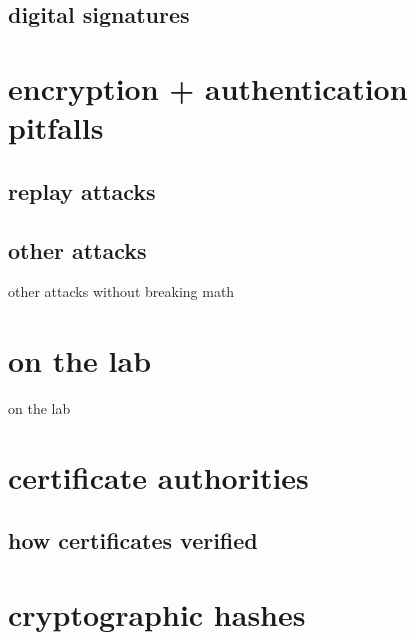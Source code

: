 

\subsection{digital signatures}



\section{encryption + authentication pitfalls}



\subsection{replay attacks}



\subsection{other attacks}

\begin{frame}{other attacks without breaking math}
\end{frame}



\section{on the lab}
\begin{frame}{on the lab}
\end{frame}

\section{certificate authorities}



\subsection{how certificates verified}


\section{cryptographic hashes}

